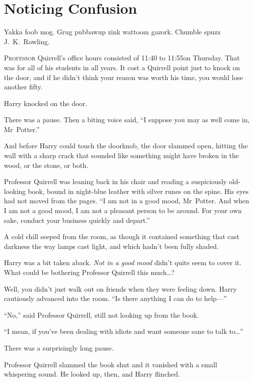 \chapter{Noticing Confusion}

\begin{chapterOpeningAuthorNote}
Yakka foob mog. Grug pubbawup zink wattoom gazork. Chumble spuzz J.~K.~Rowling.
\end{chapterOpeningAuthorNote}

\lettrine{P}{rofessor} Quirrell’s office hours consisted of 11:40 to 11:55\am on Thursday. That was for all of his students in all years. It cost a Quirrell point just to knock on the door, and if he didn’t think your reason was worth his time, you would lose another fifty.

Harry knocked on the door.

There was a pause. Then a biting voice said,
“I suppose you may as well come in, Mr~Potter.”

And before Harry could touch the doorknob, the door slammed open, hitting the wall with a sharp crack that sounded like something might have broken in the wood, or the stone, or both.

Professor Quirrell was leaning back in his chair and reading a suspiciously old-looking book, bound in night-blue leather with silver runes on the spine. His eyes had not moved from the pages.
“I am not in a good mood, Mr~Potter. And when I am not a good mood, I am not a pleasant person to be around. For your own sake, conduct your business quickly and depart.”

A cold chill seeped from the room, as though it contained something that cast darkness the way lamps cast light, and which hadn’t been fully shaded.

Harry was a bit taken aback. \emph{Not in a good mood} didn’t quite seem to cover it. What could be bothering Professor Quirrell this much…?

Well, you didn’t just walk out on friends when they were feeling down. Harry cautiously advanced into the room.
“Is there anything I can do to help—”

“No,” said Professor Quirrell, still not looking up from the book.

“I mean, if you’ve been dealing with idiots and want someone sane to talk to…”

There was a surprisingly long pause.

Professor Quirrell slammed the book shut and it vanished with a small whispering sound. He looked up, then, and Harry flinched.


